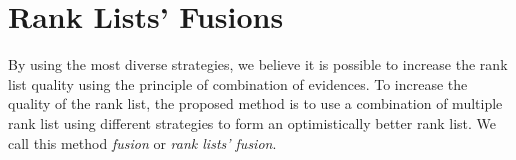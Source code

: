 \chapter{Rank Lists' Fusions \label{sec:fusions}}

By using the most diverse strategies, we believe it is possible to increase the rank list quality using the principle of combination of evidences.
To increase the quality of the rank list, the proposed method is to use a combination of multiple rank list using different strategies to form an optimistically better rank list.
We call this method \textit{fusion} or \textit{rank lists' fusion}.





